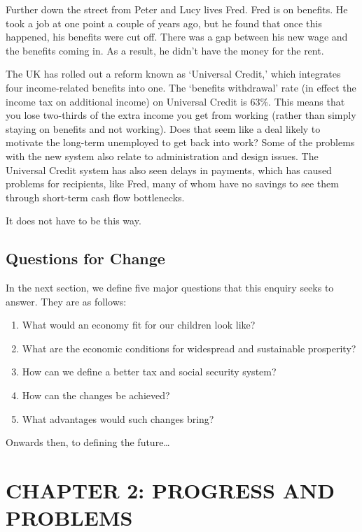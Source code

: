 \documentclass[]{tufte-handout}
\providecommand{\tightlist}{%
  \setlength{\itemsep}{0pt}\setlength{\parskip}{0pt}}
\begin{document}
Further down the street from Peter and Lucy lives Fred. Fred is on
benefits. He took a job at one point a couple of years ago, but he found
that once this happened, his benefits were cut off. There was a gap
between his new wage and the benefits coming in. As a result, he didn't
have the money for the rent.

The UK has rolled out a reform known as `Universal Credit,' which
integrates four income-related benefits into one. The `benefits
withdrawal' rate (in effect the income tax on additional income) on
Universal Credit is 63\%. This means that you lose two-thirds of the
extra income you get from working (rather than simply staying on
benefits and not working). Does that seem like a deal likely to motivate
the long-term unemployed to get back into work? Some of the problems
with the new system also relate to administration and design issues. The
Universal Credit system has also seen delays in payments, which has
caused problems for recipients, like Fred, many of whom have no savings
to see them through short-term cash flow bottlenecks.

It does not have to be this way.

\hypertarget{questions-for-change}{%
\subsection{Questions for Change}\label{questions-for-change}}

In the next section, we define five major questions that this enquiry
seeks to answer. They are as follows:

\begin{enumerate}
\def\labelenumi{\arabic{enumi}.}
\tightlist
\item
  What would an economy fit for our children look like?
\item
  What are the economic conditions for widespread and sustainable
  prosperity?
\item
  How can we define a better tax and social security system?
\item
  How can the changes be achieved?
\item
  What advantages would such changes bring?
\end{enumerate}

Onwards then, to defining the future\ldots{}

\newpage

\hypertarget{chapter-2-progress-and-problems}{%
\section{CHAPTER 2: PROGRESS AND
PROBLEMS}\label{chapter-2-progress-and-problems}}
\end{document}
